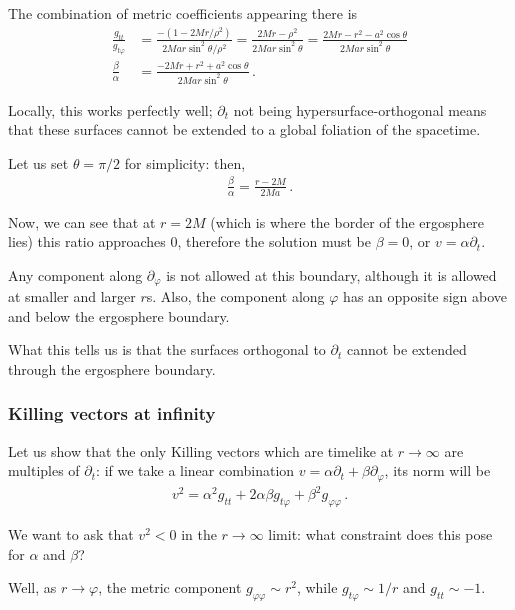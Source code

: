 \documentclass[main.tex]{subfiles}
\begin{document}
The combination of metric coefficients appearing there is %
\begin{align}
\frac{g_{tt}}{g_{t \varphi }} &= 
\frac{- (1 - 2Mr / \rho^2)}{2Mar \sin^2 \theta / \rho^2} = \frac{2Mr - \rho^2}{2Mar \sin^2\theta } = \frac{2Mr - r^2 - a^2 \cos \theta }{2Mar \sin^2 \theta }  \\
\frac{\beta }{\alpha} &= \frac{ -2Mr + r^2 + a^2 \cos \theta}{2Mar \sin^2 \theta }
\,.
\end{align}

Locally, this works perfectly well; \(\partial_t\) not being hypersurface-orthogonal 
means that these surfaces cannot be extended to a global foliation of the spacetime. 

Let us set \(\theta = \pi /2\) for simplicity: then, 
%
\begin{align}
\frac{\beta }{\alpha} = \frac{r - 2M}{2Ma}
\,.
\end{align}

Now, we can see that at \(r = 2M\) (which is where the border of the ergosphere lies) this ratio approaches 0, therefore the 
solution must be \(\beta = 0\), or \(v = \alpha \partial_t\).

Any component along \(\partial_\varphi\) is not allowed at this boundary, although it is allowed at smaller and larger \(r\)s.
Also, the component along \(\varphi \) has an opposite sign above and below the ergosphere boundary. 

What this tells us is that the surfaces orthogonal to \(\partial_t\) cannot be extended through the ergosphere boundary.

\subsubsection{Killing vectors at infinity}

Let us show that the only Killing vectors which are timelike at \(r \to \infty \) are multiples of \(\partial_t\): if we take a linear combination \(v = \alpha \partial_t + \beta \partial_\varphi\), its norm will be 
%
\begin{align}
v^2 = \alpha^2 g_{tt} + 2 \alpha \beta g_{t \varphi } + \beta^2 g_{\varphi \varphi }
\,.
\end{align}

We want to ask that \(v^2 < 0\) in the \(r \to \infty \) limit: what constraint does this pose for \(\alpha \) and \(\beta \)? 

Well, as \(r \to \varphi \), the metric component \(g_{\varphi \varphi } \sim r^2 \), while \(g_{t \varphi } \sim 1 /r\) and \(g_{tt} \sim -1\).
\end{document}
